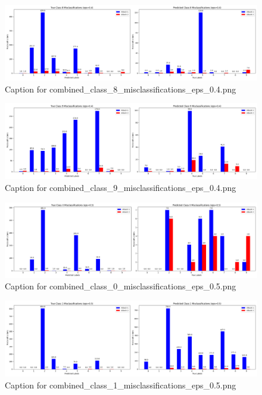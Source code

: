 \documentclass[11pt,onside]{article}
\begin{document}
\begin{figure}[ht]
\centering
\includegraphics[width=1\textwidth]{combined_class_boundary_pgd/combined_class_8_misclassifications_eps_0.4.png}
\caption{Caption for combined_class_8_misclassifications_eps_0.4.png}
\label{fig:combined_class_8_misclassifications_eps_0.4.png}
\end{figure}

\begin{figure}[ht]
\centering
\includegraphics[width=1\textwidth]{combined_class_boundary_pgd/combined_class_9_misclassifications_eps_0.4.png}
\caption{Caption for combined_class_9_misclassifications_eps_0.4.png}
\label{fig:combined_class_9_misclassifications_eps_0.4.png}
\end{figure}



\begin{figure}[ht]
\centering
\includegraphics[width=1\textwidth]{combined_class_boundary_pgd/combined_class_0_misclassifications_eps_0.5.png}
\caption{Caption for combined_class_0_misclassifications_eps_0.5.png}
\label{fig:combined_class_0_misclassifications_eps_0.5.png}
\end{figure}

\begin{figure}[ht]
\centering
\includegraphics[width=1\textwidth]{combined_class_boundary_pgd/combined_class_1_misclassifications_eps_0.5.png}
\caption{Caption for combined_class_1_misclassifications_eps_0.5.png}
\label{fig:combined_class_1_misclassifications_eps_0.5.png}
\end{figure}
\end{document}

